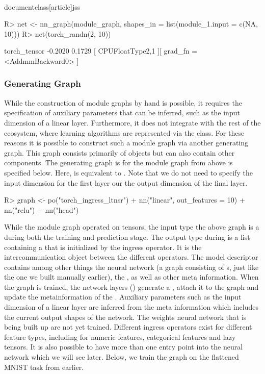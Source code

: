 \\documentclass[article]{jss}
\theoremstyle{definition}
\begin{document}
\begin{CodeInput}
R> net <- nn_graph(module_graph, shapes_in = list(module_1.input = c(NA, 10)))
R> net(torch_randn(2, 10))
\end{CodeInput}
\begin{CodeOutput}
torch_tensor
-0.2020
 0.1729
[ CPUFloatType{2,1} ][ grad_fn = <AddmmBackward0> ]
\end{CodeOutput}

\subsubsection{Generating Graph}

While the construction of module graphs by hand is possible, it requires the specification of auxiliary parameters that can be inferred, such as the input dimension of a linear layer.
Furthermore, it does not integrate with the rest of the  ecosystem, where learning algorithms are represented via the  class.
For these reasons it is possible to construct such a module graph via another generating graph.
This graph consists primarily of  objects but can also contain other components.
The generating graph is for the module graph from above is specified below.
Here,  is equivalent to .
Note that we do not need to specify the input dimension for the first layer our the output dimension of the final layer.

\begin{CodeInput}
R> graph <- po("torch_ingress_ltnsr") %
+    nn("linear", out_features = 10) %
+    nn("relu") %
+    nn("head")
\end{CodeInput}

While the module graph operated on tensors, the input type the above graph is a  during both the training and prediction stage.
The output type during  is a list containing a  that is initialized by the ingress operator.
It is the intercommunication object between the different  operators.
The model descriptor contains among other things the neural network (a graph consisting of s, just like the one we built manually earlier), the , as well as other meta information.
When the graph is trained, the network layers () generate a , attach it to the graph and update the metainformation of the .
Auxiliary parameters such as the input dimension of a linear layer are inferred from the meta information which includes the current output shapes of the network.
The weights neural network that is being built up are not yet trained.
Different ingress operators exist for different feature types, including for numeric features, categorical features and lazy tensors.
It is also possible to have more than one entry point into the neural network which we will see later.
Below, we train the graph on the flattened MNIST task from earlier.
\end{document}
